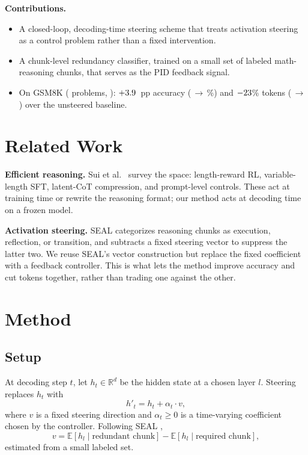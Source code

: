 \documentclass[11pt]{article}
\begin{document}
\noindent\textbf{Contributions.}
\begin{itemize}
\itemsep0.2ex
\item A closed-loop, decoding-time steering scheme that treats activation
      steering as a control problem rather than a fixed intervention.
\item A chunk-level redundancy classifier, trained on a small set of labeled
      math-reasoning chunks, that serves as the PID feedback signal.
\item On GSM8K (\NProblems{} problems, \ModelName): $+3.9$~pp accuracy
      (\BaselineAcc$\,\to\,$\StupidAcc\%) and $-23$\% tokens
      (\BaselineTokens$\,\to\,$\StupidTokens) over the unsteered baseline.
\end{itemize}

\section{Related Work}

\noindent\textbf{Efficient reasoning.} Sui et al.\ \cite{sui2025stop} survey the
space: length-reward RL, variable-length SFT, latent-CoT compression, and
prompt-level controls. These act at training time or rewrite the reasoning
format; our method acts at decoding time on a frozen model.

\noindent\textbf{Activation steering.} SEAL \cite{chen2025seal} categorizes
reasoning chunks as execution, reflection, or transition, and subtracts a fixed
steering vector to suppress the latter two. We reuse SEAL's vector construction
but replace the fixed coefficient with a feedback controller. This is what lets
the method improve accuracy and cut tokens together, rather than trading one
against the other.

\section{Method}

\subsection{Setup}

At decoding step $t$, let $h_t \in \mathbb{R}^d$ be the hidden state at a chosen
layer $l$. Steering replaces $h_t$ with
\[
h'_t = h_t + \alpha_t \cdot v,
\]
where $v$ is a fixed steering direction and $\alpha_t \ge 0$ is a time-varying
coefficient chosen by the controller. Following SEAL \cite{chen2025seal},
\[
v = \mathbb{E}[h_l \mid \text{redundant chunk}] - \mathbb{E}[h_l \mid \text{required chunk}],
\]
estimated from a small labeled set.
\end{document}
